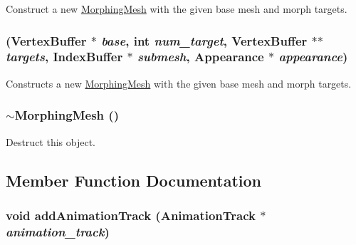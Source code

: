 Construct a new \hyperlink{classm3g_1_1MorphingMesh}{MorphingMesh} with the given base mesh and morph targets. \hypertarget{classm3g_1_1MorphingMesh_4a2347ee9c813fa1a6eef998f37bf6d5}{
\subsubsection[{MorphingMesh}]{ ({\bf VertexBuffer} $\ast$ {\em base}, \/  int {\em num\_\-target}, \/  {\bf VertexBuffer} $\ast$$\ast$ {\em targets}, \/  {\bf IndexBuffer} $\ast$ {\em submesh}, \/  {\bf Appearance} $\ast$ {\em appearance})}}
\label{classm3g_1_1MorphingMesh_4a2347ee9c813fa1a6eef998f37bf6d5}


Constructs a new \hyperlink{classm3g_1_1MorphingMesh}{MorphingMesh} with the given base mesh and morph targets. \hypertarget{classm3g_1_1MorphingMesh_cdafafba64a0167f28f3b66ac4b9d7d6}{
\subsubsection[{$\sim$MorphingMesh}]{\setlength{\rightskip}{0pt plus 5cm}$\sim${\bf MorphingMesh} ()}}
\label{classm3g_1_1MorphingMesh_cdafafba64a0167f28f3b66ac4b9d7d6}


Destruct this object. 

\subsection{Member Function Documentation}
\hypertarget{classm3g_1_1MorphingMesh_415c0b110f95410ded9b85e5d99a496b}{
\subsubsection[{addAnimationTrack}]{\setlength{\rightskip}{0pt plus 5cm}void addAnimationTrack ({\bf AnimationTrack} $\ast$ {\em animation\_\-track})}}
\label{classm3g_1_1MorphingMesh_415c0b110f95410ded9b85e5d99a496b}


